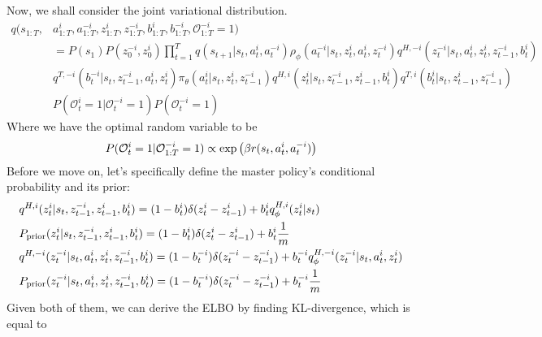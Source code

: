 Now, we shall consider the joint variational distribution. 
\begin{equation}
\begin{aligned}
    q(s_{1:T}, &a^i_{1:T}, a^{-i}_{1:T}, z^i_{1:T}, z^{-i}_{1:T}, b^i_{1:T}, b^{-i}_{1:T}, \mathcal{O}^{-i}_{1:T} = 1) \\
    &= P(s_1)P(z^{-i}_0, z^i_0)\prod^T_{t=1} q(s_{t+1} | s_t, a_t^i, a_t^{-i})\rho_\phi(a^{-i}_t | s_t, z^i_t, a^i_t, z^{-i}_t) q^{H,-i}(z^{-i}_t | s_t, a^i_t, z^i_t, z^{-i}_{t-1}, b^i_t) \\
    &q^{T,-i}(b^{-i}_t | s_t,  z^{-i}_{t-1}, a^i_t, z^i_t) \pi_\theta(a^i_t | s_t, z^i_t, z^{-i}_{t-1}) q^{H,i}(z^i_t | s_t, z^{-i}_{t-1}, z^i_{t-1}, b^i_t) q^{T,i}(b^i_t | s_t, z^i_{t-1}, z^{-i}_{t-1})\\
    &P(\mathcal{O}^i_t = 1 | \mathcal{O}^{-i}_t = 1)P(\mathcal{O}^{-i}_t = 1)
\end{aligned}
\end{equation}
Where we have the optimal random variable to be 
\begin{equation}
    P(\mathcal{O}^i_t = 1 | \mathcal{O}^{-i}_{1:T} = 1) \propto \exp\left( \beta r(s_t, a_t^i, a^{-i}_t) \right)
\end{equation}
Before we move on, let's specifically define the master policy's conditional probability and its prior:
\begin{equation}
\begin{aligned}
    &q^{H, i}(z^i_t | s_t, z^{-i}_{t-1}, z^i_{t-1}, b^i_t) = (1-b_t^i) \delta(z_t^i  - z_{t-1}^i) + b_t^i q^{H, i}_{\phi}(z_t^i | s_t) \\
    &P_{\text{prior}}(z^i_t | s_t, z^{-i}_{t-1}, z^i_{t-1}, b^i_t) = (1-b_t^i) \delta(z_t^i  - z_{t-1}^i) + b_t^i \frac{1}{m} \\
    &q^{H, -i}(z^{-i}_t | s_t, a^i_t, z^i_t, z^{-i}_{t-1}, b^i_t) = (1-b_t^{-i}) \delta(z_t^{-i}  - z_{t-1}^{-i}) + b_t^{-i} q^{H, -i}_{\phi}(z_t^{-i} | s_t, a^i_t, z^i_t) \\
    &P_{\text{prior}}(z^{-i}_t | s_t, a^i_t, z^i_t, z^{-i}_{t-1}, b^i_t) = (1-b_t^{-i}) \delta(z_t^{-i}  - z_{t-1}^{-i}) + b_t^{-i} \frac{1}{m} \\
\end{aligned}
\end{equation}
Given both of them, we can derive the ELBO by finding KL-divergence, which is equal to 
